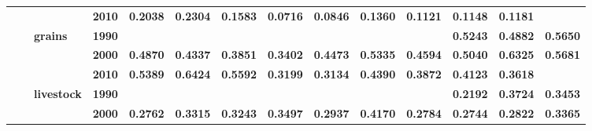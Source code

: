 \documentclass[
  authoryear,
  preprint,
  3p]{elsarticle}
\begin{document}
\begin{landscape}
\begin{longtable}[t]{>{}l>{}l>{}l>{}l>{}r>{}r>{}r>{}r>{}r>{}r>{}r>{}r>{}r>{}r}
\textbf{} & \textbf{} & \textbf{} & \textbf{2010} & \textcolor[HTML]{4285f4}{\textbf{0.2038}} & \textcolor[HTML]{4285f4}{\textbf{0.2304}} & \textcolor[HTML]{4285f4}{\textbf{0.1583}} & \textcolor[HTML]{4285f4}{\textbf{0.0716}} & \textcolor[HTML]{4285f4}{\textbf{0.0846}} & \textcolor[HTML]{4285f4}{\textbf{0.1360}} & \textcolor[HTML]{4285f4}{\textbf{0.1121}} & \textcolor[HTML]{4285f4}{\textbf{0.1148}} & \textcolor[HTML]{4285f4}{\textbf{0.1181}} & \textcolor[HTML]{4285f4}{\textbf{}}\\
\textbf{} & \textbf{} & \textbf{grains} & \textbf{1990} & \textcolor[HTML]{4285f4}{\textbf{}} & \textcolor[HTML]{4285f4}{\textbf{}} & \textcolor[HTML]{4285f4}{\textbf{}} & \textcolor[HTML]{4285f4}{\textbf{}} & \textcolor[HTML]{4285f4}{\textbf{}} & \textcolor[HTML]{4285f4}{\textbf{}} & \textcolor[HTML]{4285f4}{\textbf{}} & \textcolor[HTML]{4285f4}{\textbf{0.5243}} & \textcolor[HTML]{4285f4}{\textbf{0.4882}} & \textcolor[HTML]{4285f4}{\textbf{0.5650}}\\
\addlinespace
\textbf{} & \textbf{} & \textbf{} & \textbf{2000} & \textcolor[HTML]{4285f4}{\textbf{0.4870}} & \textcolor[HTML]{4285f4}{\textbf{0.4337}} & \textcolor[HTML]{4285f4}{\textbf{0.3851}} & \textcolor[HTML]{4285f4}{\textbf{0.3402}} & \textcolor[HTML]{4285f4}{\textbf{0.4473}} & \textcolor[HTML]{4285f4}{\textbf{0.5335}} & \textcolor[HTML]{4285f4}{\textbf{0.4594}} & \textcolor[HTML]{4285f4}{\textbf{0.5040}} & \textcolor[HTML]{4285f4}{\textbf{0.6325}} & \textcolor[HTML]{4285f4}{\textbf{0.5681}}\\
\textbf{} & \textbf{} & \textbf{} & \textbf{2010} & \textcolor[HTML]{4285f4}{\textbf{0.5389}} & \textcolor[HTML]{4285f4}{\textbf{0.6424}} & \textcolor[HTML]{4285f4}{\textbf{0.5592}} & \textcolor[HTML]{4285f4}{\textbf{0.3199}} & \textcolor[HTML]{4285f4}{\textbf{0.3134}} & \textcolor[HTML]{4285f4}{\textbf{0.4390}} & \textcolor[HTML]{4285f4}{\textbf{0.3872}} & \textcolor[HTML]{4285f4}{\textbf{0.4123}} & \textcolor[HTML]{4285f4}{\textbf{0.3618}} & \textcolor[HTML]{4285f4}{\textbf{}}\\
\textbf{} & \textbf{} & \textbf{livestock} & \textbf{1990} & \textcolor[HTML]{4285f4}{\textbf{}} & \textcolor[HTML]{4285f4}{\textbf{}} & \textcolor[HTML]{4285f4}{\textbf{}} & \textcolor[HTML]{4285f4}{\textbf{}} & \textcolor[HTML]{4285f4}{\textbf{}} & \textcolor[HTML]{4285f4}{\textbf{}} & \textcolor[HTML]{4285f4}{\textbf{}} & \textcolor[HTML]{4285f4}{\textbf{0.2192}} & \textcolor[HTML]{4285f4}{\textbf{0.3724}} & \textcolor[HTML]{4285f4}{\textbf{0.3453}}\\
\textbf{} & \textbf{} & \textbf{} & \textbf{2000} & \textcolor[HTML]{4285f4}{\textbf{0.2762}} & \textcolor[HTML]{4285f4}{\textbf{0.3315}} & \textcolor[HTML]{4285f4}{\textbf{0.3243}} & \textcolor[HTML]{4285f4}{\textbf{0.3497}} & \textcolor[HTML]{4285f4}{\textbf{0.2937}} & \textcolor[HTML]{4285f4}{\textbf{0.4170}} & \textcolor[HTML]{4285f4}{\textbf{0.2784}} & \textcolor[HTML]{4285f4}{\textbf{0.2744}} & \textcolor[HTML]{4285f4}{\textbf{0.2822}} & \textcolor[HTML]{4285f4}{\textbf{0.3365}}\\

\end{longtable}
\end{landscape}
\end{document}
